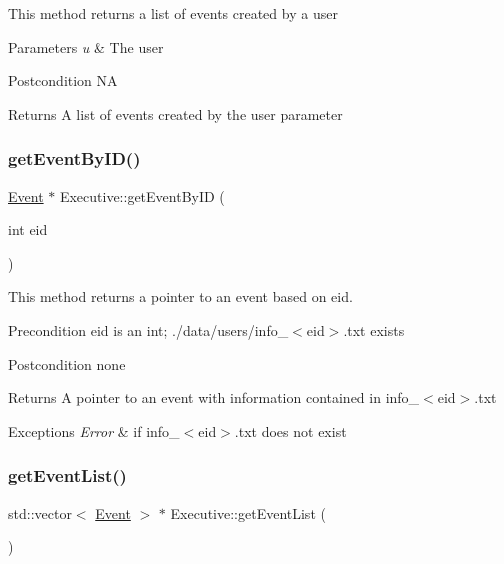 This method returns a list of events created by a user 
\begin{DoxyParams}{Parameters}
{\em u} & The user \\
\hline
\end{DoxyParams}
\begin{DoxyPostcond}{Postcondition}
NA 
\end{DoxyPostcond}
\begin{DoxyReturn}{Returns}
A list of events created by the user parameter 
\end{DoxyReturn}
\mbox{\label{class_executive_a13bb89f1f430e27fe3b99d1ef10bf07b}} 
\subsubsection{\texorpdfstring{get\+Event\+By\+I\+D()}{getEventByID()}}
{\footnotesize\ttfamily \mbox{\hyperlink{class_event}{Event}} $\ast$ Executive\+::get\+Event\+By\+ID (\begin{DoxyParamCaption}\item[{int}]{eid }\end{DoxyParamCaption})}

This method returns a pointer to an event based on eid. \begin{DoxyPrecond}{Precondition}
eid is an int; ./data/users/info\+\_\+$<$eid$>$.txt exists 
\end{DoxyPrecond}
\begin{DoxyPostcond}{Postcondition}
none 
\end{DoxyPostcond}
\begin{DoxyReturn}{Returns}
A pointer to an event with information contained in info\+\_\+$<$eid$>$.\+txt 
\end{DoxyReturn}

\begin{DoxyExceptions}{Exceptions}
{\em Error} & if info\+\_\+$<$eid$>$.\+txt does not exist \\
\hline
\end{DoxyExceptions}
\mbox{\label{class_executive_ab8fa8f11ea8794947da209d295c7e8fd}} 
\subsubsection{\texorpdfstring{get\+Event\+List()}{getEventList()}}
{\footnotesize\ttfamily std\+::vector$<$ \mbox{\hyperlink{class_event}{Event}} $>$ $\ast$ Executive\+::get\+Event\+List (\begin{DoxyParamCaption}{ }\end{DoxyParamCaption})}

